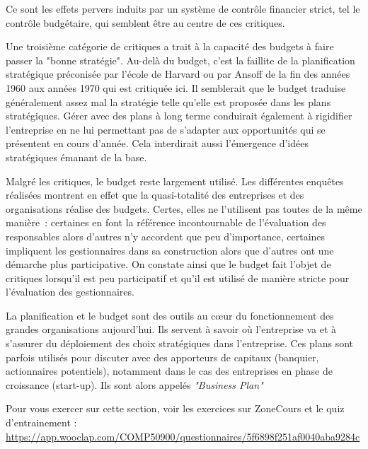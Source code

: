 \documentclass[oneside]{kaobook}
\begin{document}
Ce sont les effets pervers induits par un système de contrôle financier strict, tel le contrôle budgétaire, qui semblent être au centre de ces critiques. 

Une troisième catégorie de critiques a trait à la capacité des budgets à faire passer la "bonne stratégie". Au-delà du budget, c'est la faillite de la planification stratégique préconisée par l'école de Harvard ou par Ansoff de la fin des années 1960 aux années 1970 qui est critiquée ici. Il semblerait que le budget traduise généralement assez mal la stratégie telle qu'elle est proposée dans les plans stratégiques. Gérer avec des plans à long terme conduirait également à rigidifier l'entreprise en ne lui permettant pas de s'adapter aux opportunités qui se présentent en cours d'année. Cela interdirait aussi l'émergence d'idées stratégiques émanant de la base. 

Malgré les critiques, le budget reste largement utilisé. Les différentes enquêtes réalisées montrent en effet que la quasi-totalité des entreprises et des organisations réalise des budgets. Certes, elles ne l'utilisent pas toutes de la même manière : certaines en font la référence incontournable de l'évaluation des responsables alors d'autres n'y accordent que peu d'importance, certaines impliquent les gestionnaires dans sa construction alors que d'autres ont une démarche plus participative. On constate ainsi que le budget fait l'objet de critiques lorsqu'il est peu participatif et qu'il est utilisé de manière stricte pour l'évaluation des gestionnaires.

La planification et le budget sont des outils au cœur du fonctionnement des grandes organisations aujourd'hui. Ils servent à savoir où l'entreprise va et à s'assurer du déploiement des choix stratégiques dans l'entreprise. Ces plans sont parfois utilisés pour discuter avec des apporteurs de capitaux (banquier, actionnaires potentiels), notamment dans le cas des entreprises en phase de croissance (start-up). Ils sont alors appelés \emph{"Business Plan"}

\begin{kaobox}
Pour vous exercer sur cette section, voir les exercices sur ZoneCours et le quiz d'entrainement : \url{https://app.wooclap.com/COMP50900/questionnaires/5f6898f251af0040aba9284c}
\end{kaobox}
\end{document}
